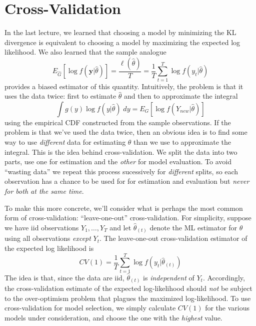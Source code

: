\documentclass[12pt]{article}
\theoremstyle{definition}
\begin{document}
\section{Cross-Validation}
In the last lecture, we learned that choosing a model by minimizing the KL divergence is equivalent to choosing a model by maximizing the expected log likelihood. We also learned that the sample analogue
 $$E_{\widehat{G}}\left[\log f(\textbf{y}|\widehat{\theta}) \right]= \frac{\ell(\widehat{\theta})}{T}= \frac{1}{T} \sum_{t=1}^T \log f(y_t|\widehat{\theta})$$
provides a biased estimator of this quantity. Intuitively, the problem is that it uses the data twice: first to estimate $\widehat{\theta}$ and then to approximate the integral
	$$\int g(y) \log f(y|\widehat{\theta}) \; dy = E_G\left[\log f(Y_{new}|\widehat{\theta}) \right]$$
using the empirical CDF constructed from the sample observations. If the problem is that we've used the data twice, then an obvious idea is to find some way to use \emph{different} data for estimating $\theta$ than we use to approximate the integral. This is the idea behind cross-validation. We split the data into two parts, use one for estimation and the \emph{other} for model evaluation. To avoid ``wasting data'' we repeat this process sucessively for \emph{different} splits, so each observation has a chance to be used for for estimation and evaluation but \emph{never for both at the same time}.

To make this more concrete, we'll consider what is perhaps the most common form of cross-validation: ``leave-one-out'' cross-validation. For simplicity, suppose we have iid observations $Y_1, \hdots, Y_T$ and let $\widehat{\theta}_{(t)}$ denote the ML estimator for $\theta$ using all observations \emph{except} $Y_t$. The leave-one-out cross-validation estimator of the expected log likelihood is
	$$CV(1) = \frac{1}{T} \sum_{t=1}^T \log f(y_t|\widehat{\theta}_{(t)})$$
The idea is that, since the data are iid, $\widehat{\theta}_{(t)}$ is \emph{independent} of $Y_t$. Accordingly, the cross-validation estimate of the expected log-likelihood should \emph{not} be subject to the over-optimism problem that plagues the maximized log-likelihood. To use cross-validation for model selection, we simply calculate $CV(1)$ for the various models under consideration, and choose the one with the \emph{highest} value.
\end{document}

